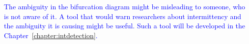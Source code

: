 \par
\textcolor{blue}{
The ambiguity in the bifurcation diagram might be misleading to someone, who is not aware of it.
A tool that would warn researchers about intermittency and the ambiguity it is causing might be useful.
Such a tool will be developed in the Chapter~\ref{chapter:intdetection}.
}

\endinput